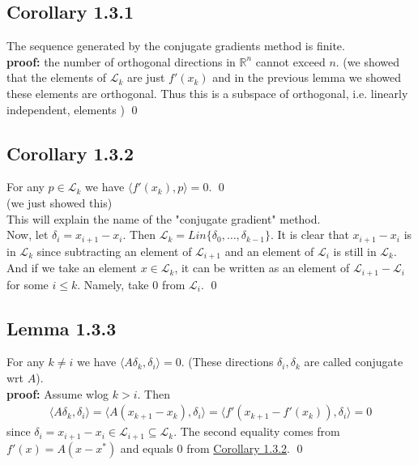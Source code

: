 \documentclass[12pt,a4paper]{article}
\begin{document}
	\subsection*{Corollary 1.3.1}\label{corr131}
	The sequence generated by the conjugate gradients method is finite.\\
	\textbf{proof:} the number of orthogonal directions in $\mathbb{R}^n$ cannot exceed $n$. (we showed that the elements of $\mathcal{L}_k$ are just $f'(x_k)$ and in the previous lemma we showed these elements are orthogonal. Thus this is a subspace of orthogonal, i.e. linearly independent, elements ) \qed
	
	\subsection*{Corollary 1.3.2}\label{cor132}
	For any $p \in \mathcal{L}_k$ we have $\langle f'(x_k), p \rangle = 0$. \qed\\ (we just showed this)\\
	This will explain the name of the "conjugate gradient" method.\\
	Now, let $\delta_i = x_{i+1} - x_i$. Then $\mathcal{L}_k = Lin \{\delta_0, \ldots , \delta_{k-1}\}$. It is clear that $x_{i+1} - x_i$ is in $\mathcal{L}_k$ since subtracting an element of $\mathcal{L}_{i+1}$ and an element of $\mathcal{L}_{i}$ is still in $\mathcal{L}_k$. And if we take an element $ x \in \mathcal{L}_k$, it can be written as an element of $\mathcal{L}_{i+1} - \mathcal{L}_i$ for some $i\leq k$. Namely, take $0$ from $\mathcal{L}_i$. \qed
	
	\subsection*{Lemma 1.3.3}\label{lem133}
	For any $k \neq i$ we have $\langle A\delta_k, \delta_i \rangle = 0$. (These directions $\delta_i, \delta_k$ are called conjugate wrt $A$).\\
	\textbf{proof:} Assume wlog $k > i$. Then
	\begin{align*}
		\langle A\delta_k, \delta_i \rangle = \langle A(x_{k+1} - x_k), \delta_i \rangle = \langle f'(x_{k+1} - f'(x_k)), \delta_i \rangle = 0
	\end{align*}
	since $\delta_i = x_{i+1} - x_i \in \mathcal{L}_{i+1} \subseteq \mathcal{L}_k$. The second equality comes from $f'(x) = A(x - x^*)$ and equals $0$ from \hyperref[cor132]{Corollary 1.3.2}. \qed
	
\end{document}
